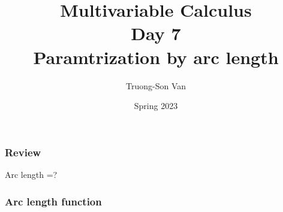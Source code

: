 \documentclass[aspectratio=169]{beamer}
\title{ Multivariable Calculus \\ Day 7 \\ Paramtrization by arc length}
\institute{Fulbright University Vietnam}
\author{Truong-Son Van}
\date{Spring 2023}
\begin{document}
\maketitle

\begin{frame}
    \frametitle{Review}

    Arc length =?
\end{frame}

\begin{frame}
    \frametitle{Arc length function}
\end{frame}
\end{document}
